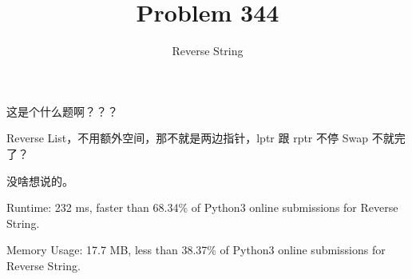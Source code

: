 \documentclass[UTF8]{ctexart}
\title{Problem 344}
\author{Reverse String}
\begin{document}
\maketitle

这是个什么题啊？？？

Reverse List，不用额外空间，那不就是两边指针，lptr 跟 rptr 不停 Swap 不就完了？

没啥想说的。

Runtime: 232 ms, faster than 68.34\% of Python3 online submissions for Reverse String.

Memory Usage: 17.7 MB, less than 38.37\% of Python3 online submissions for Reverse String.
\end{document}

